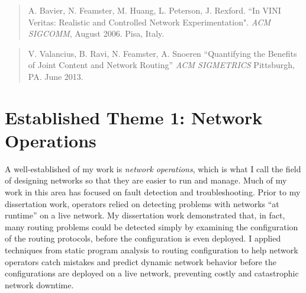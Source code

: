 \begin{quote}
A. Bavier, N. Feamster, M. Huang, L. Peterson, J. Rexford. ``In VINI
Veritas: Realistic and Controlled Network Experimentation". {\em ACM
SIGCOMM}, August 2006. Pisa, Italy.
\end{quote}

\begin{quote}
V. Valancius, B. Ravi, N. Feamster, A. Snoeren
``Quantifying the Benefits of Joint Content and Network Routing''
{\em ACM SIGMETRICS}
Pittsburgh, PA. June 2013.
\end{quote}


\newpage


\section*{Established Theme 1: Network Operations}

A well-established of my work is {\em network operations}, which is what
I call the field of designing networks so that they are easier to run
and manage.  Much of my work in this area has focused on fault detection
and troubleshooting.  Prior to my dissertation work, operators relied on
detecting problems with networks ``at runtime'' on a live network.  My
dissertation work demonstrated that, in fact, many routing problems
could be detected simply by examining the configuration of the routing
protocols, before the configuration is even deployed.  I applied
techniques from static program analysis to routing configuration to help
network operators catch mistakes and predict dynamic network behavior
before the configurations are deployed on a live network, preventing
costly and catastrophic network downtime.


